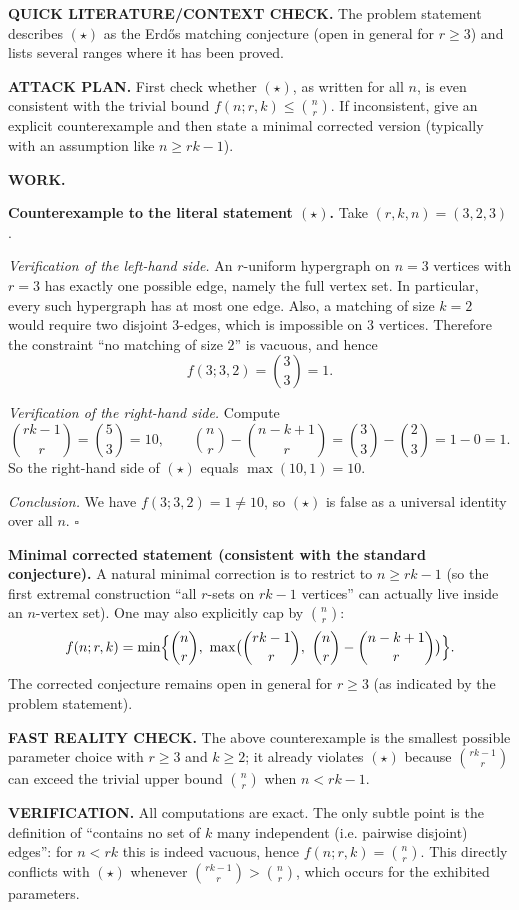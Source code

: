 \medskip
\noindent\textbf{QUICK LITERATURE/CONTEXT CHECK.}
The problem statement describes $(\star)$ as the Erd\H{o}s matching conjecture (open in general for $r\ge 3$) and lists several ranges where it has been proved.

\medskip
\noindent\textbf{ATTACK PLAN.}
First check whether $(\star)$, as written for all $n$, is even consistent with the trivial bound $f(n;r,k)\le \binom{n}{r}$.
If inconsistent, give an explicit counterexample and then state a minimal corrected version (typically with an assumption like $n\ge rk-1$).

\medskip
\noindent\textbf{WORK.}

\noindent\textbf{Counterexample to the literal statement $(\star)$.}
Take $(r,k,n)=(3,2,3)$.

\textit{Verification of the left-hand side.}
An $r$-uniform hypergraph on $n=3$ vertices with $r=3$ has exactly one possible edge, namely the full vertex set.
In particular, every such hypergraph has at most one edge.
Also, a matching of size $k=2$ would require two disjoint $3$-edges, which is impossible on $3$ vertices.
Therefore the constraint “no matching of size $2$” is vacuous, and hence
\[
f(3;3,2)=\binom{3}{3}=1.
\]

\textit{Verification of the right-hand side.}
Compute
\[
\binom{rk-1}{r}=\binom{5}{3}=10,
\qquad
\binom{n}{r}-\binom{n-k+1}{r}=\binom{3}{3}-\binom{2}{3}=1-0=1.
\]
So the right-hand side of $(\star)$ equals $\max(10,1)=10$.

\textit{Conclusion.}
We have $f(3;3,2)=1\ne 10$, so $(\star)$ is false as a universal identity over all $n$.
\hfill$\square$

\medskip
\noindent\textbf{Minimal corrected statement (consistent with the standard conjecture).}
A natural minimal correction is to restrict to $n\ge rk-1$ (so the first extremal construction “all $r$-sets on $rk-1$ vertices” can actually live inside an $n$-vertex set). One may also explicitly cap by $\binom{n}{r}$:
\[
 f(n;r,k)=\min\Bigl\{\binom{n}{r},\ \max\bigl(\binom{rk-1}{r},\ \binom{n}{r}-\binom{n-k+1}{r}\bigr)\Bigr\}.
\]
The corrected conjecture remains open in general for $r\ge 3$ (as indicated by the problem statement).

\medskip
\noindent\textbf{FAST REALITY CHECK.}
The above counterexample is the smallest possible parameter choice with $r\ge 3$ and $k\ge 2$; it already violates $(\star)$ because $\binom{rk-1}{r}$ can exceed the trivial upper bound $\binom{n}{r}$ when $n<rk-1$.

\medskip
\noindent\textbf{VERIFICATION.}
All computations are exact.
The only subtle point is the definition of “contains no set of $k$ many independent (i.e. pairwise disjoint) edges”: for $n<rk$ this is indeed vacuous, hence $f(n;r,k)=\binom{n}{r}$.
This directly conflicts with $(\star)$ whenever $\binom{rk-1}{r}>\binom{n}{r}$, which occurs for the exhibited parameters.

